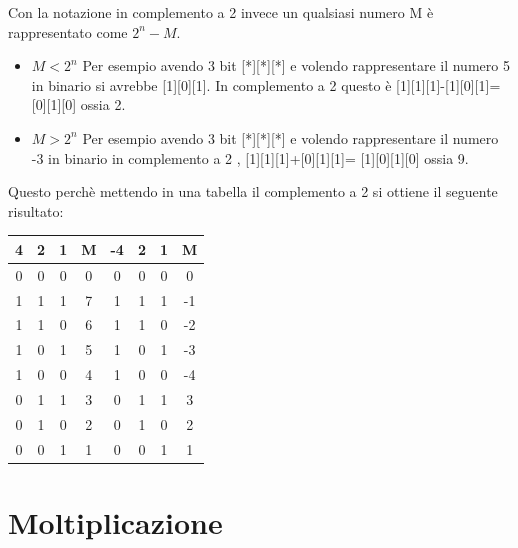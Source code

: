 \documentclass[a4paper]{book}
\begin{document}
Con la notazione in complemento a 2 invece un qualsiasi numero M è rappresentato come \(2^n-M\).

\begin{itemize}
\item{\(M<2^n\)}
Per esempio avendo 3 bit [*][*][*] e volendo rappresentare il numero 5 in binario si avrebbe [1][0][1].
In complemento a 2 questo è [1][1][1]-[1][0][1]=[0][1][0] ossia 2.
\item{\(M>2^n\)}
Per esempio avendo 3 bit [*][*][*] e volendo rappresentare il numero -3 in binario in complemento a 2 , [1][1][1]+[0][1][1]= [1][0][1][0] ossia 9.

\end{itemize}
Questo perchè mettendo in una tabella il complemento a 2 si ottiene il seguente risultato:\\

\begin{center}
\begin{tabular}{|c|c|c|c||c|c|c|c|}
\hline
4 & 2 & 1 & M & -4 & 2 & 1 & M  \\
\hline
0 & 0 & 0 & 0 &  0 & 0 & 0 & 0  \\
\hline
1 & 1 & 1 & 7 &  1 & 1 & 1 & -1 \\
\hline
1 & 1 & 0 & 6 &  1 & 1 & 0 & -2 \\
\hline
1 & 0 & 1 & 5 &  1 & 0 & 1 & -3 \\
\hline
1 & 0 & 0 & 4 &  1 & 0 & 0 & -4 \\
\hline
0 & 1 & 1 & 3 &  0 & 1 & 1 & 3  \\
\hline
0 & 1 & 0 & 2 &  0 & 1 & 0 & 2  \\
\hline
0 & 0 & 1 & 1 &  0 & 0 & 1 & 1  \\
\hline
\end{tabular}
\end{center}

\section{Moltiplicazione}
\end{document}
